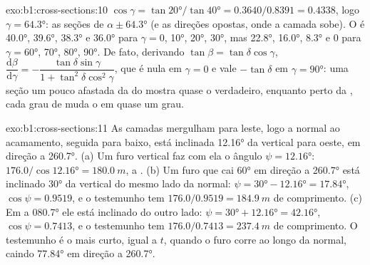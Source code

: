 \begin{solution}{exo:b1:cross-sections:10}
$\cos\gamma = \tan\ang{20}/\tan\ang{40} = 0.3640/0.8391 = 0.4338$, logo
$\gamma = \ang{64.3}$: as seções de  $\alpha \pm \ang{64.3}$
(e as direções opostas, onde a camada sobe). O  é
\ang{40.0}, \ang{39.6}, \ang{38.3} e \ang{36.0} para $\gamma = 0$, \ang{10},
\ang{20}, \ang{30}, mas \ang{22.8}, \ang{16.0}, \ang{8.3} e $0$ para
$\gamma = \ang{60}$, \ang{70}, \ang{80}, \ang{90}. De fato, derivando
$\tan\beta = \tan\delta\cos\gamma$,
$\dfrac{\mathrm d\beta}{\mathrm d\gamma} =
-\dfrac{\tan\delta\sin\gamma}{1 + \tan^2\delta\cos^2\gamma}$, que é nula
em $\gamma = 0$ e vale $-\tan\delta$ em $\gamma = \ang{90}$: uma seção um pouco afastada da  do  mostra quase o  verdadeiro, enquanto perto da , cada grau de  muda o  em quase um grau.
\end{solution}

\begin{solution}{exo:b1:cross-sections:11}
As camadas mergulham para leste, logo a normal ao acamamento, seguida para baixo, está inclinada \ang{12.16} da vertical para oeste, em direção a \ang{260.7}.
(a) Um furo vertical faz com ela o ângulo $\psi = \ang{12.16}$:
$176.0/\cos\ang{12.16} = \qty{180.0}{m}$, a . (b) Um
furo que cai \ang{60} em direção a \ang{260.7} está inclinado \ang{30} da vertical do mesmo lado da normal: $\psi = \ang{30} - \ang{12.16} =
\ang{17.84}$, $\cos\psi = 0.9519$, e o testemunho tem $176.0/0.9519 =
\qty{184.9}{m}$ de comprimento. (c) Em  a \ang{080.7} ele está inclinado do outro lado:
$\psi = \ang{30} + \ang{12.16} = \ang{42.16}$, $\cos\psi = 0.7413$, e o
testemunho tem $176.0/0.7413 = \qty{237.4}{m}$ de comprimento. O testemunho é o mais curto, igual a $t$, quando o furo corre ao longo da normal, caindo \ang{77.84} em direção a \ang{260.7}.
\end{solution}

